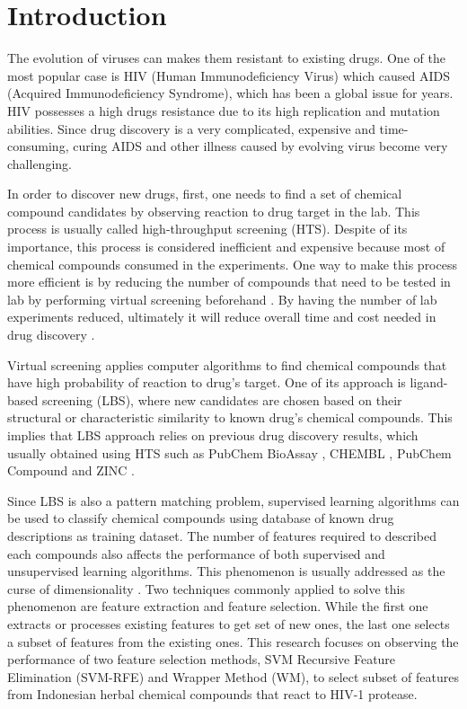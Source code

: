 \documentclass[conference,compsoc,12pt]{IEEEtran}
\begin{document}
	\IEEEpeerreviewmaketitle
	
	\section{Introduction}
	
	The evolution of viruses can makes them resistant to existing drugs. One of the most popular case is HIV (Human Immunodeficiency Virus) which caused AIDS (Acquired Immunodeficiency Syndrome), which has been a global issue for years. HIV possesses a high drugs resistance due to its high replication and mutation abilities. Since drug discovery is a very complicated, expensive and time-consuming, curing AIDS and other illness caused by evolving virus become very challenging\cite{yanuar2014virtual}.
	
	In order to discover new drugs, first, one needs to find a set of chemical compound candidates by observing reaction to drug target in the lab. This process is usually called high-throughput screening (HTS). Despite of its importance, this process is considered inefficient and expensive because most of chemical compounds consumed in the experiments. One way to make this process more efficient is by reducing the number of compounds that need to be tested in lab by performing virtual screening beforehand \cite{chen2017developing}. By having the number of lab experiments reduced, ultimately it will reduce overall time and cost needed in drug discovery \cite{korkmaz2014drug}.
	
	Virtual screening applies computer algorithms to find chemical compounds that have high probability of reaction to drug's target. One of its approach is ligand-based screening (LBS), where new candidates are chosen based on their structural or characteristic similarity to known drug's chemical compounds. This implies that LBS approach relies on previous drug discovery results, which usually obtained using HTS such as PubChem BioAssay \cite{bioassay2014update}, CHEMBL \cite{bento2014chembl}, PubChem Compound \cite{kim2015pubchem} and ZINC \cite{irwin2012zinc}.
	
	Since LBS is also a pattern matching problem, supervised learning algorithms can be used to classify chemical compounds using database of known drug descriptions as training dataset. The number of features required to described each compounds also affects the performance of both supervised and unsupervised learning algorithms. This phenomenon is usually addressed as the curse of dimensionality \cite{janecek2008relationship}. Two techniques commonly applied to solve this phenomenon are feature extraction and feature selection. While the first one extracts or processes existing features to get set of new ones, the last one selects a subset of features from the existing ones. This research focuses on observing the performance of two feature selection methods, SVM Recursive Feature Elimination (SVM-RFE) and Wrapper Method (WM), to select subset of features from Indonesian herbal chemical compounds that react to HIV-1 protease.
	
\end{document}
